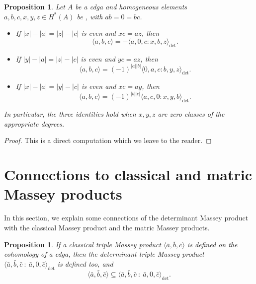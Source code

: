 \documentclass[11pt]{article}
\newtheorem{proposition}[theorem]{Proposition}
\theoremstyle{definition}
\theoremstyle{definition}
\begin{document}
\begin{proposition} 
\label{prop:ordinary-as-determinant} 
Let $A$ be a cdga and homogeneous elements $a,b,c,x,y,z\in H^*(A)$ be , 
with $ab=0=bc$. 
\begin{itemize}

    \item If $|x|-|a|=|z|-|c|$ is even and $xc=az$, then
    \begin{equation*}
    \langle a,b,c\rangle = -\langle a,0,c : x,b,z \rangle_{\det}. 
    \end{equation*}

    \item If $|y|-|a|=|z|-|c|$ is even and $yc=az$, then
     \begin{equation*}
    \langle a,b,c\rangle = (-1)^{|a||b|}\langle 0,a,c : b,y, z\rangle_{\det}. 
     \end{equation*}
    \item If $|x|-|a|=|y|-|c|$ is even and $xc=ay$, then
     \begin{equation*}
    \langle a,b,c\rangle = (-1)^{|b||c|}\langle a,c,0 : x,y, b\rangle_{\det}. 
    \end{equation*}
\end{itemize}
In particular, the three identities hold when $x,y,z$ are zero classes of the appropriate degrees. 
\end{proposition}


\begin{proof}
This is a direct computation which we leave to the reader.    
\end{proof}












\section{Connections to classical and matric Massey products}
\label{sec: connections to classical and matric Massey products}


In this section, 
we explain some connections of the determinant Massey product with the classical Massey product
and the matric Massey products.







\begin{proposition}
\label{prop: determinant Massey contains Massey}
If a classical triple Massey product $\langle \bar a,\bar b,\bar c\rangle$ is defined on the cohomology of a cdga, 
then the determinant triple Massey product $\langle \bar a,\bar b,\bar c \ : \ \bar a, 0, \bar c\rangle_{\det}$ 
is defined too, 
and 
\begin{equation*}
\langle \bar a,\bar b,\bar c\rangle \subseteq \langle \bar a,\bar b,\bar c \ : \ \bar a, 0, \bar c\rangle_{\det}.
\end{equation*}
\end{proposition}
\end{document}
